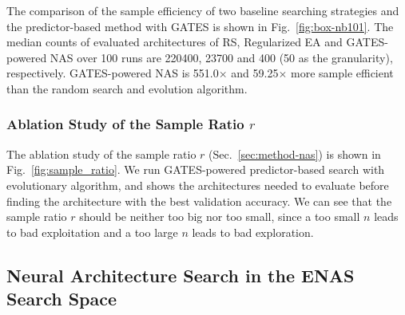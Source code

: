 \documentclass[runningheads]{llncs}
\begin{document}
The comparison of the sample efficiency of two baseline searching strategies and the predictor-based method with GATES is shown in Fig.~\ref{fig:box-nb101}.
The median counts of evaluated architectures of RS, Regularized EA and GATES-powered NAS over 100 runs are 220400, 23700 and 400 (50 as the granularity), respectively.
GATES-powered NAS is 551.0$\times$ and 59.25$\times$ more sample efficient than the random search and evolution algorithm.

\subsubsection{Ablation Study of the Sample Ratio $r$}
The ablation study of the sample ratio $r$ (Sec.~\ref{sec:method-nas}) is shown in Fig.~\ref{fig:sample_ratio}.
We run GATES-powered predictor-based search with evolutionary algorithm, and shows the architectures needed to evaluate before finding the architecture with the best validation accuracy. 
We can see that the sample ratio $r$ should be neither too big nor too small, since a too small $n$ leads to bad exploitation and a too large $n$ leads to bad exploration.



\subsection{Neural Architecture Search in the ENAS Search Space}
\label{sec:exp-nas-enas}
\end{document}
